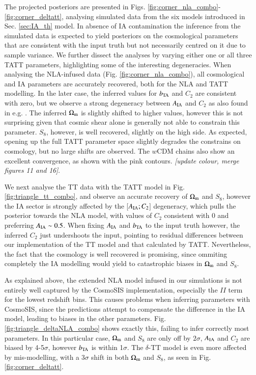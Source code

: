  The projected posteriors  are presented in Figs. \ref{fig:corner_nla_combo}-\ref{fig:corner_deltatt}, analysing simulated data from the six models introduced in Sec. \ref{sec:IA_th} model. In absence of IA contamination the inference from the simulated data is expected to yield posteriors on the cosmological parameters that are consistent with the input truth but not necessarily centred on it due to sample variance. We further dissect the analyses by varying either  one or  all three TATT parameters, highlighting some of the interesting degeneracies.   When analysing the NLA-infused data (Fig. \ref{fig:corner_nla_combo}), all cosmological and IA  parameters are accurately recovered, both for the NLA and TATT modelling. In the later case, the inferred values for $b_{\rm TA}$ and $C_2$ are consistent with zero, but we observe a strong degeneracy between  $A_{\rm IA}$ and  $C_2$ as also found in e.g. \citet[][\it  cite other papers?]{Paopiamsap2024}. 
The inferred  $\Omega_{\rm m}$ is slightly shifted to higher values, however this is not surprising given that cosmic shear alone is generally not able to constrain this parameter. $S_8$, however,  is well recovered, slightly on the high side. As expected, opening up the full TATT parameter space slightly degrades the constrains on cosmology, but no large shifts are observed. The $w$CDM chains also show an excellent convergence, as shown with the pink contours. {\it [update colour, merge figures 11 and 16]}.
 


 We next analyse the TT data with the TATT model in Fig. \ref{fig:triangle_tt_combo}, and  observe an accurate recovery of  $\Omega_{\rm m}$ and $S_8$, however the IA sector is strongly affected by the [$A_{\rm IA}; C_2$] degeneracy, which  pulls the posterior towards the NLA model, with values of $C_2$ consistent with 0 and preferring $A_{\rm IA}\sim 0.5$. When fixing $A_{\rm IA}$ and $b_{\rm TA}$ to the input truth however, the inferred $C_2$ just undershoots the input, pointing to residual differences between our implementation of the TT model and that calculated by TATT. Nevertheless, the fact that the cosmology is well recovered is promising, since ommiting completely the IA modelling would yield to catastrophic biases in $\Omega_{\rm m}$ and $S_8$. 


 As explained above, the extended NLA model infused in our simulations is not entirely well captured by the {\sc CosmoSIS} implementation, especially the $II$ term for the lowest redshift bins. This causes problems when inferring parameters with  {\sc CosmoSIS}, since the predictions attempt to compensate the difference in the IA model, leading to biases in the other parameters. Fig. \ref{fig:triangle_deltaNLA_combo} shows exactly this, failing to infer correctly most parameters. In this particular case,  $\Omega_{\rm m}$ and $S_8$ are only off by $2\sigma$, $A_{\rm IA}$ and $C_2$ are biased by 4-5$\sigma$, however $b_{\rm TA}$ is within 1$\sigma$. The $\delta$-TT model is even more affected by mis-modelling, with a 3$\sigma$ shift in both $\Omega_{\rm m}$ and $S_8$, as seen in Fig. \ref{fig:corner_deltatt}.
 

